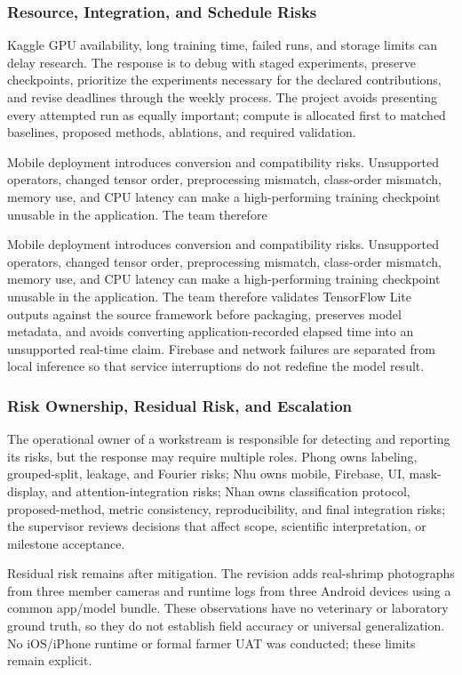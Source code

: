 \subsubsection{Resource, Integration, and Schedule Risks}
Kaggle GPU availability, long training time, failed runs, and storage limits can delay research. The response is to debug with staged experiments, preserve checkpoints, prioritize the experiments necessary for the declared contributions, and revise deadlines through the weekly process. The project avoids presenting every attempted run as equally important; compute is allocated first to matched baselines, proposed methods, ablations, and required validation.\par
Mobile deployment introduces conversion and compatibility risks. Unsupported operators, changed tensor order, preprocessing mismatch, class-order mismatch, memory use, and CPU latency can make a high-performing training checkpoint unusable in the application. The team therefore\par
Mobile deployment introduces conversion and compatibility risks. Unsupported operators, changed tensor order, preprocessing mismatch, class-order mismatch, memory use, and CPU latency can make a high-performing training checkpoint unusable in the application. The team therefore validates TensorFlow Lite outputs against the source framework before packaging, preserves model metadata, and avoids converting application-recorded elapsed time into an unsupported real-time claim. Firebase and network failures are separated from local inference so that service interruptions do not redefine the model result.\par
\subsubsection{Risk Ownership, Residual Risk, and Escalation}
The operational owner of a workstream is responsible for detecting and reporting its risks, but the response may require multiple roles. Phong owns labeling, grouped-split, leakage, and Fourier risks; Nhu owns mobile, Firebase, UI, mask-display, and attention-integration risks; Nhan owns classification protocol, proposed-method, metric consistency, reproducibility, and final integration risks; the supervisor reviews decisions that affect scope, scientific interpretation, or milestone acceptance.\par
Residual risk remains after mitigation. The revision adds real-shrimp photographs from three member cameras and runtime logs from three Android devices using a common app/model bundle. These observations have no veterinary or laboratory ground truth, so they do not establish field accuracy or universal generalization. No iOS/iPhone runtime or formal farmer UAT was conducted; these limits remain explicit.\par
